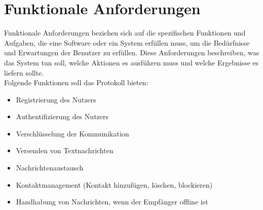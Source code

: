 \section{Funktionale Anforderungen}



Funktionale Anforderungen beziehen sich auf die spezifischen Funktionen und Aufgaben, 
die eine Software oder ein System erfüllen muss, um die Bedürfnisse und Erwartungen der Benutzer zu erfüllen.
Diese Anforderungen beschreiben, was das System tun soll, welche Aktionen es ausführen muss und welche 
Ergebnisse es liefern sollte.
\\

\noindent Folgende Funktionen soll das Protokoll bieten:

\begin{itemize}
    \item Registrierung des Nutzers
    \item Authentifizierung des Nutzers
    \item Verschlüsselung der Kommunikation
    \item Versenden von Textnachrichten
    \item Nachrichtenaustausch
    \item Kontaktmanagement (Kontakt hinzufügen, löschen, blockieren)
    \item Handhabung von Nachrichten, wenn der Empfänger offline ist
\end{itemize}


%
%